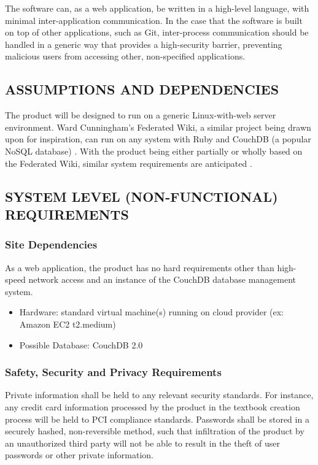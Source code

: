 \documentclass[onecolumn, draftclsnofoot,10pt, compsoc]{IEEEtran}
\begin{document}
\bigskip

{\noindent
The software can, as a web application, be written in a high-level language, with
minimal inter-application communication. In the case that the software is built
on top of other applications, such as Git, inter-process communication should be
handled in a generic way that provides a high-security barrier, preventing malicious
users from accessing other, non-specified applications.}

\subsection[ASSUMPTIONS AND DEPENDENCIES]{ASSUMPTIONS AND DEPENDENCIES}

{\noindent
The product will be designed to run on a generic Linux-with-web server environment.
Ward Cunningham's Federated Wiki, a similar project being drawn upon for inspiration, can run
on any system with Ruby and CouchDB (a popular NoSQL database) \cite{Federated}.
With the product being either partially or wholly based on the Federated Wiki, similar system
requirements are anticipated \cite{Federated}.

\subsection[SYSTEM LEVEL (NON{}-FUNCTIONAL) REQUIREMENTS]{SYSTEM LEVEL (NON-FUNCTIONAL) REQUIREMENTS}


\subsubsection[Site Dependencies]{Site Dependencies}
As a web application, the product has no hard requirements other than high-speed
network access and an instance of the CouchDB database management system.
\begin{itemize}
  \item Hardware: standard virtual machine(s) running on cloud provider (ex: Amazon EC2
  t2.medium)
  \item Possible Database: CouchDB 2.0
\end{itemize}

\subsubsection[Safety, Security and Privacy Requirements]{Safety, Security and Privacy Requirements}

{\noindent
Private information shall be held to any relevant security standards. For instance,
any credit card information processed by the product in the textbook creation process
will be held to PCI compliance standards. Passwords shall be stored in a securely hashed,
non-reversible method, such that infiltration of the product by an unauthorized
third party will not be able to result in the theft of user passwords or other private
information.}

}
\end{document}
